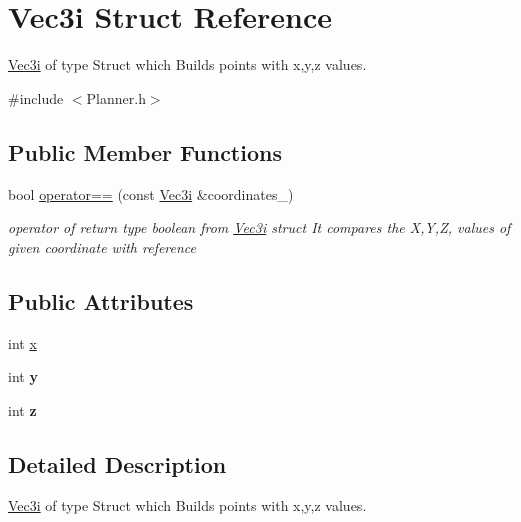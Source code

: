 \hypertarget{structVec3i}{}\section{Vec3i Struct Reference}
\label{structVec3i}


\hyperlink{structVec3i}{Vec3i} of type Struct which Builds points with x,y,z values.  




{\ttfamily \#include $<$Planner.\+h$>$}

\subsection*{Public Member Functions}
\begin{DoxyCompactItemize}
\item 
bool \hyperlink{structVec3i_abc87945692cbc7cd92b855a5d3fcd668}{operator==} (const \hyperlink{structVec3i}{Vec3i} \&coordinates\+\_\+)
\begin{DoxyCompactList}\small\item\em operator of return type boolean from \hyperlink{structVec3i}{Vec3i} struct It compares the X,Y,Z, values of given coordinate with reference \end{DoxyCompactList}\end{DoxyCompactItemize}
\subsection*{Public Attributes}
\begin{DoxyCompactItemize}
\item 
int \hyperlink{structVec3i_a00db3692921caac03a0e0fd3d8f619c9}{x}
\item 
int {\bfseries y}\hypertarget{structVec3i_a2d63847534d5ae0829f5e0e69d93d02c}{}\label{structVec3i_a2d63847534d5ae0829f5e0e69d93d02c}

\item 
int {\bfseries z}\hypertarget{structVec3i_a5b773400513d24edae3f7e806651a21c}{}\label{structVec3i_a5b773400513d24edae3f7e806651a21c}

\end{DoxyCompactItemize}


\subsection{Detailed Description}
\hyperlink{structVec3i}{Vec3i} of type Struct which Builds points with x,y,z values. 

